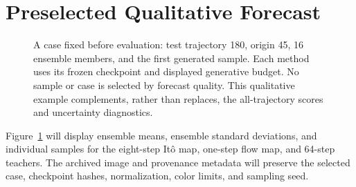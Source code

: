 \section{Preselected Qualitative Forecast}
\begin{figure}[p]
\centering
{}
\caption{A case fixed before evaluation: test trajectory 180, origin 45, 16 ensemble members, and the first generated sample. Each method uses its frozen checkpoint and displayed generative budget. No sample or case is selected by forecast quality. This qualitative example complements, rather than replaces, the all-trajectory scores and uncertainty diagnostics.}
\label{fig:qualitative}
\end{figure}
Figure~\ref{fig:qualitative} will display ensemble means, ensemble standard deviations, and individual samples for the eight-step It\^o map, one-step flow map, and 64-step teachers. The archived image and provenance metadata will preserve the selected case, checkpoint hashes, normalization, color limits, and sampling seed.
